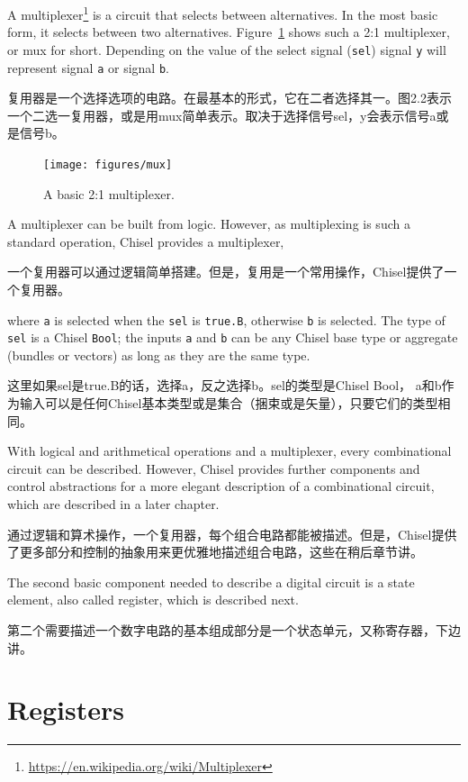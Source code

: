 \documentclass[%
    10pt,
    headinclude, footexclude,
    openright, %
    notitlepage,
    cleardoubleempty,
    headsepline,
    pointlessnumbers,
    bibtotoc, idxtotoc,
    ]{scrbook}
\newcommand{\code}[1]{{\small{\texttt{#1}}}}
\newcommand{\myref}[2]{\href{#1}{#2}}
\renewcommand{\myref}[2]{{#2}{\footnote{\url{#1}}}}
\begin{document}
A \myref{https://en.wikipedia.org/wiki/Multiplexer}{multiplexer} is a circuit that selects between alternatives.
In the most basic form, it selects between two alternatives. Figure~\ref{fig:mux} shows
such a 2:1 multiplexer, or mux for short. Depending on the value of the
select signal (\code{sel}) signal \code{y} will represent signal \code{a} or
signal \code{b}.

复用器是一个选择选项的电路。在最基本的形式，它在二者选择其一。图2.2表示一个二选一复用器，或是用mux简单表示。取决于选择信号sel，y会表示信号a或是信号b。


\begin{figure}
  \centering
  \texttt{[image: figures/mux]}
  \caption{A basic 2:1 multiplexer.}
  \label{fig:mux}
\end{figure}

A multiplexer can be built from logic.
However, as multiplexing  is such a standard operation, Chisel provides a multiplexer,

一个复用器可以通过逻辑简单搭建。但是，复用是一个常用操作，Chisel提供了一个复用器。


\noindent where \code{a} is selected when the \code{sel} is \code{true.B}, otherwise \code{b}
is selected. The type of \code{sel} is a Chisel \code{Bool}; the inputs \code{a} and \code{b}
can be any Chisel base type or aggregate (bundles or vectors) as long as they are the same
type.

这里如果sel是true.B的话，选择a，反之选择b。sel的类型是Chisel Bool， a和b作为输入可以是任何Chisel基本类型或是集合（捆束或是矢量），只要它们的类型相同。

With logical and arithmetical operations and a multiplexer, every combinational
circuit can be described. However, Chisel provides further components and control abstractions
for a more elegant description of a combinational circuit, which are described in
a later chapter.

通过逻辑和算术操作，一个复用器，每个组合电路都能被描述。但是，Chisel提供了更多部分和控制的抽象用来更优雅地描述组合电路，这些在稍后章节讲。


The second basic component needed to describe a digital circuit is a state element,
also called register, which is described next.

第二个需要描述一个数字电路的基本组成部分是一个状态单元，又称寄存器，下边讲。

\section{Registers}
\end{document}
